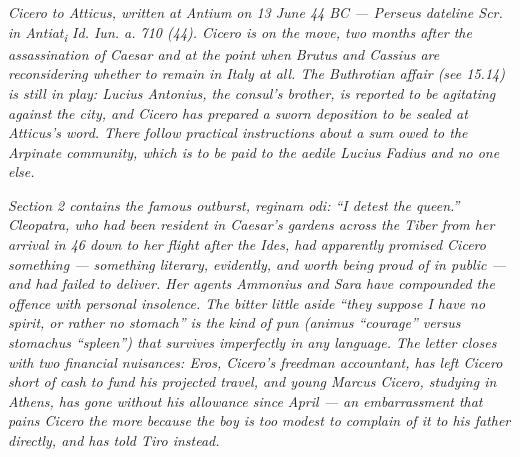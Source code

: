 
\textit{Cicero to Atticus, written at Antium on 13 June 44 BC ---
Perseus dateline \textit{Scr. in Antiat\textsubscript{i} Id. Iun.
a. 710 (44)}. Cicero is on the move, two months after the
assassination of Caesar and at the point when Brutus and Cassius
are reconsidering whether to remain in Italy at all. The
Buthrotian affair (see 15.14) is still in play: Lucius Antonius,
the consul's brother, is reported to be agitating against the
city, and Cicero has prepared a sworn deposition to be sealed at
Atticus's word. There follow practical instructions about a sum
owed to the Arpinate community, which is to be paid to the
aedile Lucius Fadius and no one else.}

\textit{Section 2 contains the famous outburst, \textit{reginam
odi}: ``I detest the queen.'' Cleopatra, who had been resident
in Caesar's gardens across the Tiber from her arrival in 46 down
to her flight after the Ides, had apparently promised Cicero
something --- something literary, evidently, and worth being
proud of in public --- and had failed to deliver. Her agents
Ammonius and Sara have compounded the offence with personal
insolence. The bitter little aside ``they suppose I have no
spirit, or rather no stomach'' is the kind of pun (\textit{animus}
``courage'' versus \textit{stomachus} ``spleen'') that survives
imperfectly in any language. The letter closes with two
financial nuisances: Eros, Cicero's freedman accountant, has
left Cicero short of cash to fund his projected travel, and
young Marcus Cicero, studying in Athens, has gone without his
allowance since April --- an embarrassment that pains Cicero
the more because the boy is too modest to complain of it to his
father directly, and has told Tiro instead.}
